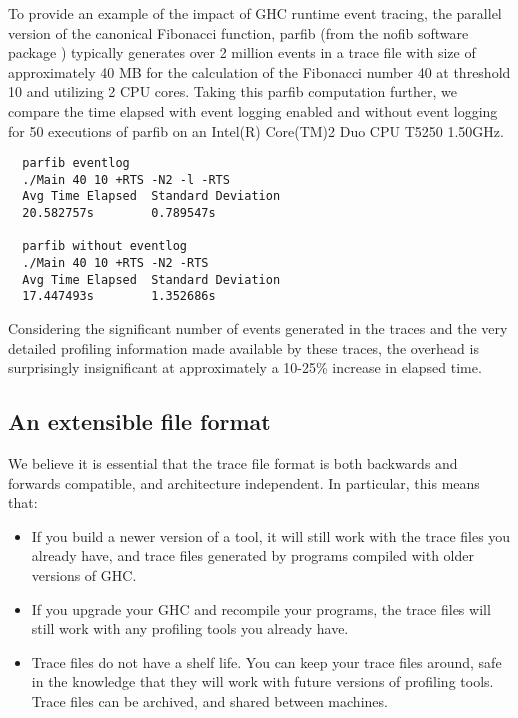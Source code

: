 \documentclass[twocolumn,9pt]{sigplanconf}
\newcommand{\codef}[1]{{\fontfamily{cmss}\small#1}}
\begin{document}
To provide an example of the impact of GHC runtime event tracing, the parallel 
version of the canonical Fibonacci function, \codef{parfib} (from
the \codef{nofib} software package \cite{nofib}) typically generates over 2 million
events in a trace file with size of approximately 40 MB for the
calculation of the Fibonacci number 40 at threshold 10 and utilizing 2 CPU cores.
Taking this parfib computation further, we compare the time elapsed with
event logging enabled and without event logging for 50 executions of
parfib on an Intel(R) Core(TM)2 Duo CPU T5250 1.50GHz.

\begin{verbatim}
  parfib eventlog 
  ./Main 40 10 +RTS -N2 -l -RTS
  Avg Time Elapsed  Standard Deviation
  20.582757s        0.789547s

  parfib without eventlog 
  ./Main 40 10 +RTS -N2 -RTS
  Avg Time Elapsed  Standard Deviation
  17.447493s        1.352686s
\end{verbatim}

Considering the significant number of events generated in the traces and
the very detailed profiling information made available by these traces, 
the overhead is surprisingly insignificant at approximately a 10-25\%
increase in elapsed time.

\subsection{An extensible file format}

We believe it is essential that the trace file format is both
backwards and forwards compatible, and architecture independent.  In
particular, this means that:

\begin{itemize}
\item If you build a newer version of a tool, it will still work with
  the trace files you already have, and trace files generated by
  programs compiled with older versions of GHC.

\item If you upgrade your GHC and recompile your programs, the trace
  files will still work with any profiling tools you already have.

\item Trace files do not have a shelf life.  You can keep your trace
  files around, safe in the knowledge that they will work with future
  versions of profiling tools.  Trace files can be archived, and
  shared between machines.
\end{itemize}
\end{document}
